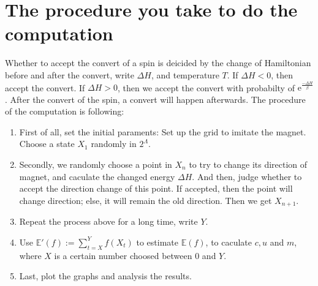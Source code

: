 \documentclass[11pt,openany]{book}              %
\begin{document}
\section{The procedure you take to do the computation }
Whether to accept the convert of a spin is deicided by the change of Hamiltonian before and after the convert, write \(\Delta H\), and temperature \(T\).
If \(\Delta H<0\), then accept the convert.
If \(\Delta H > 0 \), then we accept the convert with probabilty of \(\mathrm{e}^{\frac{- \Delta H}{\beta}}\).
After the convert of the spin, a convert will happen afterwards.
The procedure of the computation is following:
\begin{enumerate}
	\item First of all, set the initial paraments: Set up the grid to imitate the magnet.
	      Choose a state \(X_1\) randomly in \(2^\Lambda\).
	\item Secondly, we randomly choose a point in \(X_n\) to try to change its direction of magnet, and caculate the changed energy \(\Delta H\).
	      And then, judge whether to accept the direction change of this point.
	      If accepted, then the point will change direction; else, it will remain the old direction. Then we get \(X_{n+1}\).
	\item Repeat the process above for a long time, write \(Y\).
	\item Use \(\mathbb{E}'( f):=\sum_{t=X}^{Y} f( X_t)\) to estimate \(\mathbb{E}( f)\), to caculate \(c,u\) and \(m\), where \(X\) is a certain number choosed between \(0\) and \(Y\).
	\item Last, plot the graphs and analysis the results.
\end{enumerate}
\end{document}
